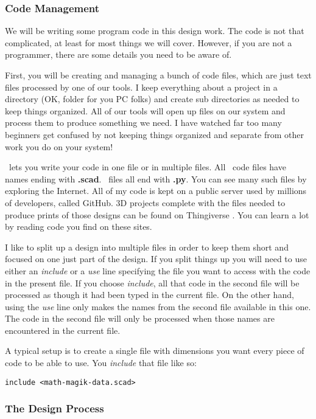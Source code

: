 \subsubsection{ Code Management}

We will be writing some program code in this design work. The code is not that
complicated, at least for most things we will cover. However, if you are not a
programmer, there are some details you need to be aware of.

First, you will be creating and managing a bunch of code files, which are just
text files processed by one of our tools. I keep everything about a project in
a directory (OK, folder for you PC folks) and create sub directories as needed
to keep things organized. All of our tools will open up files on our system and
process them to produce something we need. I have watched far too many
beginners get confused by not keeping things organized and separate from other
work you do on your system!

\osc\ lets you write your code in one file or in multiple files. All \osc\ code
files have names ending with {\bf .scad}. \PY\ files all end with {\bf .py}.
You can see many such files by exploring the Internet. All of my code is kept
on a public server used by millions of developers, called GitHub. 3D projects
complete with the files needed to produce prints of those designs can be found on
Thingiverse \cite{thingy}. You can learn a lot by reading code you find on these sites.

I like to split up a design into multiple files in order to keep them short and
focused on one just part of the design. If you split things up you will need to
use either an {\it include} or a {\it use} line specifying the file you want to
access with the code in the present file. If you choose {\it include}, all that
code in the second file will be processed as though it had been typed in the
current file.  On the other hand, using the {\it use} line only makes the names
from the second file available in this one. The code in the second file will
only be processed when those names are encountered in the current file.

A typical setup is to create a single file with dimensions you want every piece
of code to be able to use. You {\it include} that file like so:

\begin{lstlisting}
include <math-magik-data.scad>
\end{lstlisting}

\subsubsection{The Design Process}

